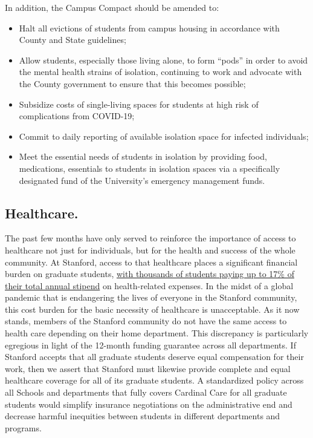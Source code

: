 \documentclass[12pt, titlepage, letterpaper]{article}
\begin{document}
In addition, the Campus Compact should be amended to:
\begin{itemize}[noitemsep]
    \item Halt all evictions of students from campus housing in accordance with County and State guidelines; 
    \item Allow students, especially those living alone, to form “pods” in order to avoid the mental health strains of isolation, continuing to work and advocate with the County government to ensure that this becomes possible;
    \item Subsidize costs of single-living spaces for students at high risk of complications from COVID-19;
    \item Commit to daily reporting of available isolation space for infected individuals;
    \item Meet the essential needs of students in isolation by providing food, medications, essentials to students in isolation spaces via a specifically designated fund of the University’s emergency management funds.
\end{itemize}

\subsection*{Healthcare.}
%


The past few months have only served to reinforce the importance of access to healthcare not just for individuals, but for the health and success of the whole community. At Stanford, access to that healthcare places a significant financial burden on graduate students, \href{https://static1.squarespace.com/static/5a371f50bff200aa91b5113a/t/5ac1dcbb8a922d9f466b040d/1522654403498/GSC-DAC+2017-18+Survey+Report.pdf}{with thousands of students paying up to 17\% of their total annual stipend} on health-related expenses. In the midst of a global pandemic that is endangering the lives of everyone in the Stanford community, this cost burden for the basic necessity of healthcare is unacceptable. As it now stands, members of the Stanford community do not have the same access to health care depending on their home department. This discrepancy is particularly egregious in light of the 12-month funding guarantee across all departments. If Stanford accepts that all graduate students deserve equal compensation for their work, then we assert that Stanford must likewise provide complete and equal healthcare coverage for all of its graduate students. A standardized policy across all Schools and departments that fully covers Cardinal Care for all graduate students would simplify insurance negotiations on the administrative end and decrease harmful inequities between students in different departments and programs.
\end{document}
